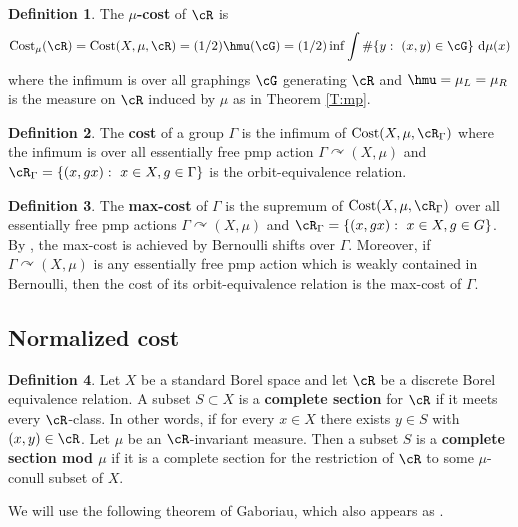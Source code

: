 \documentclass[12pt]{article}
\theoremstyle{plain}
\theoremstyle{definition}
\newtheorem{defn}{Definition}
\theoremstyle{remark}
\newcommand{\G}{\Gamma}
\newcommand\cost{{\operatorname{Cost}}}
\def\cc{{\curvearrowright}}
\newcommand{\dee}{\textrm{d}}
\begin{document}
\begin{defn}
The \textbf{$\mu$-cost} of $\cR$ is $$\cost_\mu(\cR)=\cost(X,\mu,\cR)=(1/2)\hmu(\cG)=(1/2)\inf \int \#\{y:~ (x,y)\in \cG\}~\dee\mu(x)$$ 
where the infimum is over all graphings $\cG$ generating $\cR$ and $\hmu=\mu_L=\mu_R$ is the measure on $\cR$ induced by $\mu$ as in Theorem \ref{T:mp}.   
\end{defn}

\begin{defn}
    The \textbf{cost} of a group $\G$ is the infimum of $\cost(X,\mu,\cR_\G)$ where the infimum is over all essentially free pmp action $\G \cc (X,\mu)$ and $\cR_\G=\{(x,gx):~x\in X, g\in \G\}$ is the orbit-equivalence relation. %
\end{defn}

\begin{defn}
The \textbf{max-cost} of $\G$ is the supremum of $\cost(X,\mu,\cR_\G)$  over all essentially free pmp actions $\G \cc (X,\mu)$ and $\cR_\G=\{(x,gx):~x\in X, g\in G\}$. By \cite{abert-weiss-2013}, the max-cost is achieved by Bernoulli shifts over $\G$. Moreover, if $\G \cc (X,\mu)$ is any essentially free pmp action which is weakly contained in Bernoulli, then the cost of its orbit-equivalence relation is the max-cost of $\G$.
\end{defn}


\subsection{Normalized cost}\label{S:cost-normal}

\begin{defn}
Let $X$ be a standard Borel space and let $\cR$ be a discrete Borel equivalence relation. A subset $S \subset X$ is a {\bf complete section} for $\cR$ if it meets every $\cR$-class. In other words, if for every $x\in X$ there exists $y\in S$ with $(x,y)\in \cR$. Let $\mu$ be an $\cR$-invariant measure. Then a subset $S$ is a {\bf complete section mod $\mu$} if it is a complete section for the restriction of $\cR$ to some $\mu$-conull subset of $X$.
\end{defn}
We will use the following theorem of Gaboriau, which also appears as \cite[Theorem 21.1]{MR2095154}.
\end{document}

